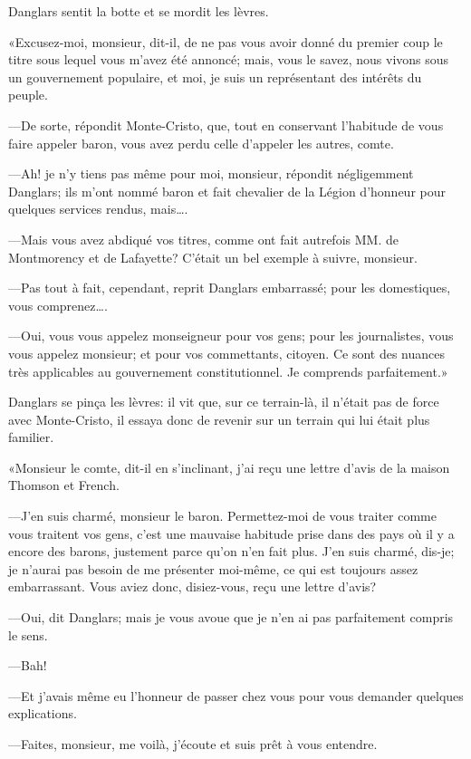 Danglars sentit la botte et se mordit les lèvres. 

«Excusez-moi, monsieur, dit-il, de ne pas vous avoir donné du premier coup le titre sous lequel vous m'avez été annoncé; mais, vous le savez, nous vivons sous un gouvernement populaire, et moi, je suis un représentant des intérêts du peuple. 

—De sorte, répondit Monte-Cristo, que, tout en conservant l'habitude de vous faire appeler baron, vous avez perdu celle d'appeler les autres, comte. 

—Ah! je n'y tiens pas même pour moi, monsieur, répondit négligemment Danglars; ils m'ont nommé baron et fait chevalier de la Légion d'honneur pour quelques services rendus, mais\dots. 

—Mais vous avez abdiqué vos titres, comme ont fait autrefois MM. de Montmorency et de Lafayette? C'était un bel exemple à suivre, monsieur. 

—Pas tout à fait, cependant, reprit Danglars embarrassé; pour les domestiques, vous comprenez\dots. 

—Oui, vous vous appelez monseigneur pour vos gens; pour les journalistes, vous vous appelez monsieur; et pour vos commettants, citoyen. Ce sont des nuances très applicables au gouvernement constitutionnel. Je comprends parfaitement.» 

Danglars se pinça les lèvres: il vit que, sur ce terrain-là, il n'était pas de force avec Monte-Cristo, il essaya donc de revenir sur un terrain qui lui était plus familier. 

«Monsieur le comte, dit-il en s'inclinant, j'ai reçu une lettre d'avis de la maison Thomson et French.  

—J'en suis charmé, monsieur le baron. Permettez-moi de vous traiter comme vous traitent vos gens, c'est une mauvaise habitude prise dans des pays où il y a encore des barons, justement parce qu'on n'en fait plus. J'en suis charmé, dis-je; je n'aurai pas besoin de me présenter moi-même, ce qui est toujours assez embarrassant. Vous aviez donc, disiez-vous, reçu une lettre d'avis? 

—Oui, dit Danglars; mais je vous avoue que je n'en ai pas parfaitement compris le sens. 

—Bah! 

—Et j'avais même eu l'honneur de passer chez vous pour vous demander quelques explications. 

—Faites, monsieur, me voilà, j'écoute et suis prêt à vous entendre. 

